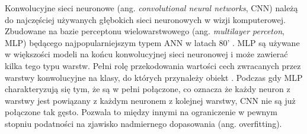 Konwolucyjne sieci neuronowe (ang. \textit{convolutional neural networks}, CNN) należą do najczęściej używanych głębokich sieci neuronowych w wizji komputerowej. Zbudowane na bazie perceptonu wielowarstwowego (ang. \textit{multilayer perceton}, MLP) będącego  najpopularniejszym typem ANN w latach 80' \cite{deep_learning, Wasserman1988NeuralNI}. MLP są używane w większości modeli na końcu konwolucyjnej sieci neuronowej i może zawierać kilka tego typu warstw. Pełni rolę przekodowania wartości cech zwracanych przez warstwy konwolucyjne na klasy, do których przynależy obiekt \cite{Krizhevsky2012ImageNetCW}. Podczas gdy MLP charakteryzują się tym, że są w pełni połączone, co oznacza że każdy neuron z warstwy jest powiązany z każdym neuronem z kolejnej warstwy, CNN nie są już połączone tak gęsto. Pozwala to między innymi na ograniczenie w pewnym stopniu podatności na zjawisko nadmiernego dopasowania (ang. {overfitting}). 

